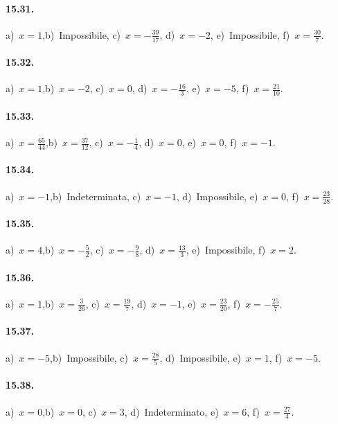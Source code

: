 \paragraph{15.31.}
a)~$x=1$,\quad b)~Impossibile, \quad c)~$x=-{\frac{39}{17}}$, \quad d)~$x=-2$, \quad e)~Impossibile, \quad f)~$x=\frac{30}{7}$.

\paragraph{15.32.}
a)~$x=1$,\quad b)~$x=-2$, \quad c)~$x=0$, \quad d)~$x=-\frac{16}{3}$, \quad e)~$x=-5$, \quad f)~$x=\frac{21}{10}$.

\paragraph{15.33.}
a)~$x=\frac{65}{44}$,\quad b)~$x=\frac{37}{12}$, \quad c)~$x=-{\frac{1}{4}}$, \quad d)~$x=0$, \quad e)~$x=0$, \quad f)~$x=-1$.

\paragraph{15.34.}
a)~$x=-1$,\quad b)~Indeterminata, \quad c)~$x=-1$, \quad d)~Impossibile, \quad e)~$x=0$, \quad f)~$x=\frac{23}{28}$.

\paragraph{15.35.}
a)~$x=4$,\quad b)~$x=-{\frac{5}{2}}$, \quad c)~$x=-{\frac{9}{8}}$, \quad d)~$x=\frac{13}{3}$, \quad e)~Impossibile, \quad f)~$x=2$.

\paragraph{15.36.}
a)~$x=1$,\quad b)~$x=\frac{3}{26}$, \quad c)~$x=\frac{19}{7}$, \quad d)~$x=-1$, \quad e)~$x=\frac{23}{20}$, \quad f)~$x=-{\frac{25}{7}}$.

\paragraph{15.37.}
a)~$x=-5$,\quad b)~Impossibile, \quad c)~$x=\frac{28}{5}$, \quad d)~Impossibile, \quad e)~$x=1$, \quad f)~$x=-5$.

\paragraph{15.38.} %
a)~$x=0$,\quad b)~$x=0$, \quad c)~$x=3$, \quad d)~Indeterminato, \quad e)~$x=6$, \quad f)~$x=\frac{27}{4}$.

